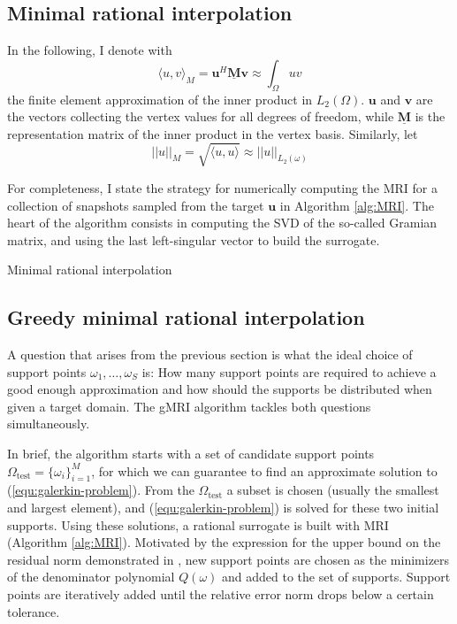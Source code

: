 \documentclass[11pt, a4paper]{article}
\begin{document}
\subsection{Minimal rational interpolation}
\label{subsec:MRI}

In the following, I denote with
\begin{equation}
    \langle u, v \rangle_M = \mathbf{u}^H \mathbf{\underline{M}} \mathbf{v} \approx \int_{\Omega} u v \label{equ:matrix-inner-product}
\end{equation}
the finite element approximation of the inner product in $L_2(\Omega)$.
$\mathbf{u}$ and $\mathbf{v}$ are the vectors collecting the vertex values for
all degrees of freedom, while $\mathbf{\underline{M}}$ is the representation matrix
of the inner product in the vertex basis. Similarly, let
\begin{equation}
    ||u||_M = \sqrt{\langle u, u \rangle} \approx ||u||_{L_2(\omega)} \label{equ:matrix-norm}
\end{equation}

For completeness, I state the strategy for numerically computing the \acrfull{MRI} 
for a collection of snapshots sampled from the target $\mathbf{u}$ \citep{greedyMRI}
in Algorithm \ref{alg:MRI}. The heart of the algorithm consists in computing the
\acrfull{SVD} of the so-called Gramian matrix, and using the last
left-singular vector to build the surrogate.

\begin{algorithm}
    \caption{Minimal rational interpolation} \label{alg:MRI}
    
\end{algorithm}

\subsection{Greedy minimal rational interpolation}
\label{subsec:gMRI}

A question that arises from the previous section is what the ideal choice of
support points $\omega_1, \dots, \omega_S$ is: How many support points are
required to achieve a good enough approximation and how should the supports
be distributed when given a target domain. The \acrfull{gMRI} algorithm 
\citep{shortMRI} tackles both questions simultaneously.

In brief, the algorithm starts with a set of candidate support points
$\Omega_{\mathrm{test}} = \{\omega_i\}_{i=1}^M$, for which we can guarantee
to find an approximate solution to (\ref{equ:galerkin-problem}). 
From the $\Omega_{\mathrm{test}}$ a subset is chosen (usually the smallest and
largest element), and (\ref{equ:galerkin-problem}) is solved for these two initial
supports. Using these solutions, a rational surrogate is built with
\acrshort{MRI} (Algorithm \ref{alg:MRI}). Motivated by the expression for the
upper bound on the residual norm demonstrated in \cite{theoryMRI}, new support
points are chosen as the minimizers of the denominator polynomial $Q(\omega)$
and added to the set of supports. Support points are iteratively added until
the relative error norm drops below a certain tolerance.
\end{document}
